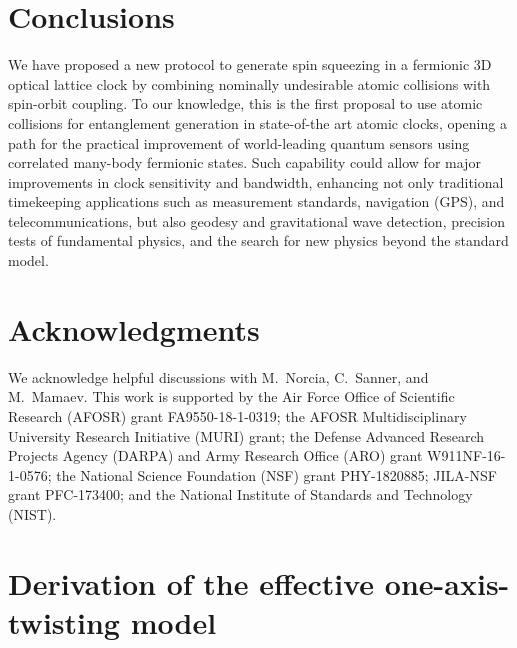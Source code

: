 \documentclass[aps,prx,superscriptaddress,notitlepage,twocolumn,longbibliography]{revtex4-1}
\begin{document}


\section{Conclusions}

We have proposed a new protocol to generate spin squeezing in a fermionic 3D optical lattice clock by combining nominally undesirable atomic collisions with spin-orbit coupling.
To our knowledge, this is the first proposal to use atomic collisions for entanglement generation in state-of-the art atomic clocks, opening a path for the practical improvement of world-leading quantum sensors using correlated many-body fermionic states.
Such capability could allow for major improvements in clock sensitivity and bandwidth, enhancing not only traditional timekeeping applications such as measurement standards, navigation (GPS), and telecommunications, but also geodesy and gravitational wave detection, precision tests of fundamental physics, and the search for new physics beyond the standard model\cite{safronova2018search}.


\section{Acknowledgments}

We acknowledge helpful discussions with M.~Norcia, C.~Sanner, and M.~Mamaev.
This work is supported by the Air Force Office of Scientific Research (AFOSR) grant FA9550-18-1-0319; the AFOSR Multidisciplinary University Research Initiative (MURI) grant; the Defense Advanced Research Projects Agency (DARPA) and Army Research Office (ARO) grant W911NF-16-1-0576; the National Science Foundation (NSF) grant PHY-1820885; JILA-NSF grant PFC-173400; and the
National Institute of Standards and Technology (NIST).


\appendix

\renewcommand\thefigure{\thesection\arabic{figure}}

\section{Derivation of the effective one-axis-twisting model}
\label{sec:derivation_OAT}
\end{document}
